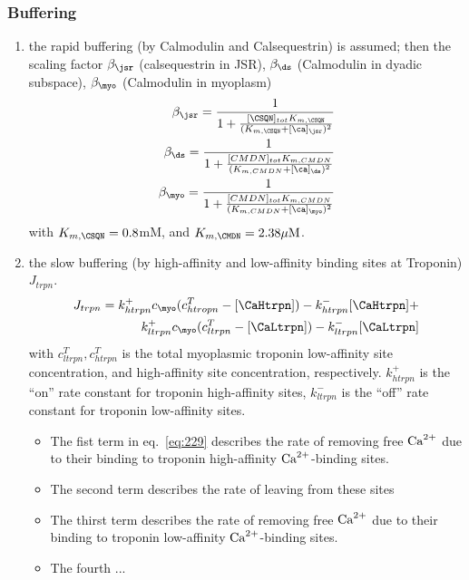 \subsubsection{Buffering}
\label{sec:buffering-4}

\begin{enumerate}
\item the rapid buffering (by Calmodulin and Calsequestrin) is
  assumed; then the scaling factor $\beta_\jsr$ (calsequestrin in
  JSR), $\beta_\ds$ (Calmodulin in dyadic subspace), $\beta_\myo$
  (Calmodulin in myoplasm)
  \begin{equation}
    \label{eq:791}
    \begin{split}
      \beta_\jsr =
      \frac{1}{1+\frac{[\CSQN]_{tot}K_{m,\CSQN}}{(K_{m,\CSQN}+[\ca]_\jsr)^2}}
      \\
      \beta_\ds =
      \frac{1}{1+\frac{[CMDN]_{tot}K_{m,CMDN}}{(K_{m,CMDN}+[\ca]_\ds)^2}}
      \\
      \beta_\myo = \frac{1}{1+\frac{[CMDN]_{tot}K_{m,CMDN}}{(K_{m,CMDN}+[\ca]_\myo)^2}}
    \end{split}
  \end{equation}
with $K_{m,\CSQN}=0.8$mM, and $K_{m,\CMDN}=2.38\muM$. 

\item the slow buffering (by high-affinity and low-affinity binding
  sites at Troponin) $J_{trpn}$.
  \begin{equation}
    \label{eq:229}
    \begin{split}
      J_{trpn} = k^+_{htrpn} c_\myo (c^T_{htropn} - [\CaHtrpn]) -
      k^-_{htrpn} [\CaHtrpn] + \\
      k^+_{ltrpn} c_\myo (c^T_{ltrpn} -
      [\CaLtrpn]) - k^-_{ltrpn} [\CaLtrpn]
    \end{split}
  \end{equation}
  with $c^T_{ltrpn}, c^T_{htrpn}$ is the total myoplasmic troponin
  low-affinity site concentration, and high-affinity site
  concentration, respectively. $k^+_{htrpn}$ is the ``on'' rate
  constant for troponin high-affinity sites, $k^-_{ltrpn}$ is the
  ``off'' rate constant for troponin low-affinity sites.
  \begin{itemize}
  \item The fist term in eq.~\eqref{eq:229} describes the rate of
    removing free ${\text{Ca}^{2+}}$ due to their binding to troponin
    high-affinity ${\text{Ca}^{2+}}$-binding sites.
  \item The second term describes the rate of leaving from these sites
  \item The thirst term describes the rate of removing free ${\text{Ca}^{2+}}$
    due to their binding to troponin low-affinity ${\text{Ca}^{2+}}$-binding
    sites.
  \item The fourth ...    
  \end{itemize}

\end{enumerate}

